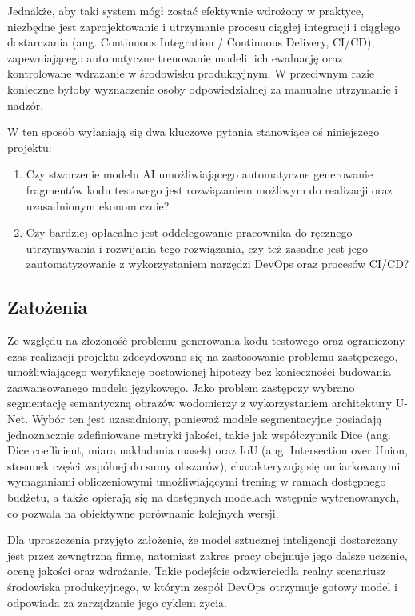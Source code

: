 Jednakże, aby taki system mógł zostać efektywnie wdrożony w praktyce, niezbędne jest zaprojektowanie i utrzymanie procesu ciągłej integracji i ciągłego dostarczania (ang. Continuous Integration / Continuous Delivery, CI/CD), zapewniającego automatyczne trenowanie modeli, ich ewaluację oraz kontrolowane wdrażanie w środowisku produkcyjnym. W przeciwnym razie konieczne byłoby wyznaczenie osoby odpowiedzialnej za manualne utrzymanie i nadzór.

W ten sposób wyłaniają się dwa kluczowe pytania stanowiące oś niniejszego projektu:
\begin{enumerate}
\item Czy stworzenie modelu AI umożliwiającego automatyczne generowanie fragmentów kodu testowego jest rozwiązaniem możliwym do realizacji oraz uzasadnionym ekonomicznie?
\item Czy bardziej opłacalne jest oddelegowanie pracownika do ręcznego utrzymywania i rozwijania tego rozwiązania, czy też zasadne jest jego zautomatyzowanie z wykorzystaniem narzędzi DevOps oraz procesów CI/CD?
\end{enumerate}

\subsection{Założenia}

Ze względu na złożoność problemu generowania kodu testowego oraz ograniczony czas realizacji projektu zdecydowano się na zastosowanie problemu zastępczego, umożliwiającego weryfikację postawionej hipotezy bez konieczności budowania zaawansowanego modelu językowego. Jako problem zastępczy wybrano segmentację semantyczną obrazów wodomierzy z wykorzystaniem architektury U-Net. Wybór ten jest uzasadniony, ponieważ modele segmentacyjne posiadają jednoznacznie zdefiniowane metryki jakości, takie jak współczynnik Dice (ang. Dice coefficient, miara nakładania masek) oraz IoU (ang. Intersection over Union, stosunek części wspólnej do sumy obszarów), charakteryzują się umiarkowanymi wymaganiami obliczeniowymi umożliwiającymi trening w ramach dostępnego budżetu, a także opierają się na dostępnych modelach wstępnie wytrenowanych, co pozwala na obiektywne porównanie kolejnych wersji.

Dla uproszczenia przyjęto założenie, że model sztucznej inteligencji dostarczany jest przez zewnętrzną firmę, natomiast zakres pracy obejmuje jego dalsze uczenie, ocenę jakości oraz wdrażanie. Takie podejście odzwierciedla realny scenariusz środowiska produkcyjnego, w którym zespół DevOps otrzymuje gotowy model i odpowiada za zarządzanie jego cyklem życia.

